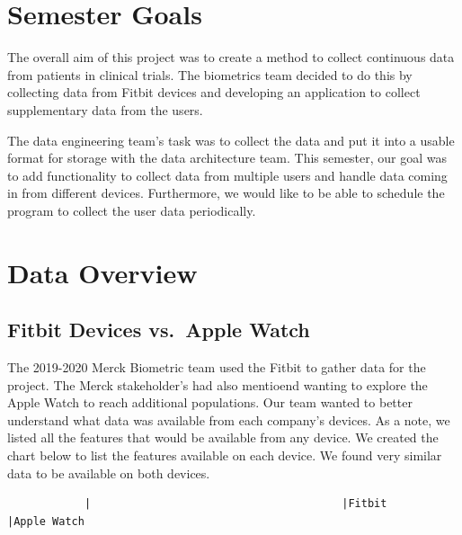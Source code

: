 \documentclass[]{book}
\begin{document}
\hypertarget{semester-goals}{%
\section{Semester Goals}\label{semester-goals}}

The overall aim of this project was to create a method to collect continuous data from patients in clinical trials. The biometrics team decided to do this by collecting data from Fitbit devices and developing an application to collect supplementary data from the users.

The data engineering team's task was to collect the data and put it into a usable format for storage with the data architecture team. This semester, our goal was to add functionality to collect data from multiple users and handle data coming in from different devices. Furthermore, we would like to be able to schedule the program to collect the user data periodically.

\hypertarget{data-overview}{%
\section{Data Overview}\label{data-overview}}

\hypertarget{fitbit-devices-vs.-apple-watch}{%
\subsection{Fitbit Devices vs.~Apple Watch}\label{fitbit-devices-vs.-apple-watch}}

The 2019-2020 Merck Biometric team used the Fitbit to gather data for the project. The Merck stakeholder's had also mentioend wanting to explore the Apple Watch to reach additional populations. Our team wanted to better understand what data was available from each company's devices. As a note, we listed all the features that would be available from any device. We created the chart below to list the features available on each device. We found very similar data to be available on both devices.

\begin{verbatim}
            |                                       |Fitbit         |Apple Watch
\end{verbatim}
\end{document}
